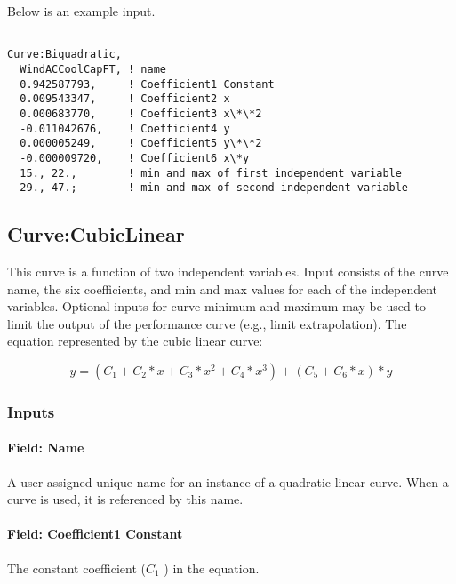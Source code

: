 Below is an example input.

\begin{lstlisting}

Curve:Biquadratic,
  WindACCoolCapFT, ! name
  0.942587793,     ! Coefficient1 Constant
  0.009543347,     ! Coefficient2 x
  0.000683770,     ! Coefficient3 x\*\*2
  -0.011042676,    ! Coefficient4 y
  0.000005249,     ! Coefficient5 y\*\*2
  -0.000009720,    ! Coefficient6 x\*y
  15., 22.,        ! min and max of first independent variable
  29., 47.;        ! min and max of second independent variable
\end{lstlisting}

\subsection{Curve:CubicLinear}\label{curvecubiclinear}

This curve is a function of two independent variables. Input consists of the curve name, the six coefficients, and min and max values for each of the independent variables. Optional inputs for curve minimum and maximum may be used to limit the output of the performance curve (e.g., limit extrapolation). The equation represented by the cubic linear curve:

\begin{equation}
y = \left( {{C_1} + {C_2}*x + {C_3}*{x^2} + {C_4}*{x^3}} \right) + \left( {{C_5} + {C_6}*x} \right)*y
\end{equation}

\subsubsection{Inputs}\label{inputs-8-014}

\paragraph{Field: Name}\label{field-name-8-012}

A user assigned unique name for an instance of a quadratic-linear curve. When a curve is used, it is referenced by this name.

\paragraph{Field: Coefficient1 Constant}\label{field-coefficient1-constant-8}

The constant coefficient (\(C_1\) ) in the equation.

